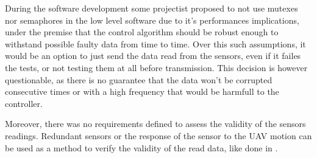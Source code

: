 During the software development some projectist proposed to not use mutexes nor semaphores in the low level software due to it's performances implications, under the premise that the control algorithm should be robust enough to withstand possible faulty data from time to time. Over this such assumptions, it would be an option to just send the data read from the sensors, even if it failes the tests, or not testing them at all before transmission. This decision is however questionable, as there is no guarantee that the data won't be corrupted consecutive times or with a high frequency that would be harmfull to the controller.%

Moreover, there was no requirements defined to assess the validity of the sensors readings. Redundant sensors or the response of the sensor to the \gls{UAV} motion can be used as a method to verify the validity of the read data, like done in \textcite{bonakdarpour_runtime_2014}.




